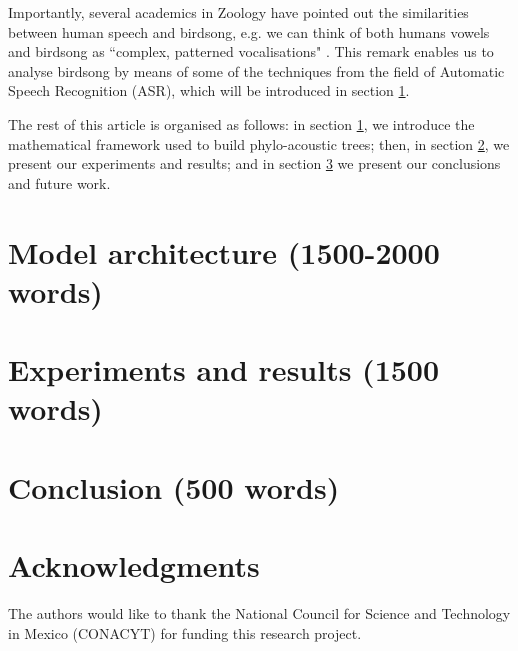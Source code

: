 \documentclass[pdftex,11pt,a4paper]{article}
\theoremstyle{definition}
\theoremstyle{remark}
\begin{document}
\par Importantly, several academics in Zoology have pointed out the similarities between human speech and birdsong, e.g. we can think of both humans vowels and birdsong as ``complex, patterned vocalisations" \cite{Berwick2013,Naguib2014}. This remark enables us to analyse birdsong by means of some of the techniques from the field of Automatic Speech Recognition (ASR), which will be introduced in section \ref{section_model}. 
\par The rest of this article is organised as follows: in section \ref{section_model}, we introduce the mathematical framework used to build phylo-acoustic trees; then, in section \ref{section_results}, we present our experiments and results; and in section \ref{section_conclusion} we present our conclusions and future work.
\section{Model architecture (1500-2000 words)}
\label{section_model}

\section{Experiments and results (1500 words)}
\label{section_results}

\section{Conclusion (500 words)}
\label{section_conclusion}
\blindtext

\section*{Acknowledgments}


The authors would like to thank the National Council for Science and Technology in Mexico (CONACYT) for funding this research project.




\end{document}
